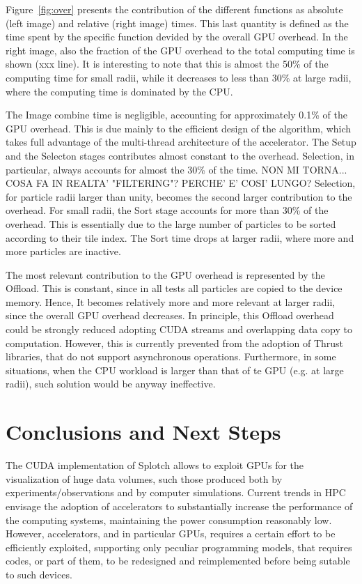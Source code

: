 \documentclass[11pt]{article}
\begin{document}
Figure~\ref{fig:over} presents the contribution of the different functions
as absolute (left image) and relative (right image) times. This last 
quantity is defined as the time spent by the specific function devided by
the overall GPU overhead. In the right image, also the fraction of the GPU
overhead to the total computing time is shown (xxx line). It is interesting to 
note that this is almost the 50\% of the computing time for small radii,
while it decreases to less than 30\% at large radii, where the
computing time is dominated by the CPU. 

The Image combine time is negligible, accounting for approximately 0.1\% of 
the GPU overhead. This is due mainly to the efficient design of the 
algorithm, which takes full advantage of the multi-thread architecture 
of the accelerator. The Setup and the Selecton stages contributes 
almost constant to the overhead. Selection, in particular, 
always accounts for almost the 30\% of the time. NON MI TORNA... COSA FA
IN REALTA' "FILTERING"? PERCHE' E' COSI' LUNGO?
Selection, for particle radii larger than unity, becomes the second 
larger contribution to the overhead. For small radii, the Sort
stage accounts for more than 30\% of the overhead. This is essentially due to 
the large number of particles to be sorted according to their tile index. 
The Sort time drops at larger radii, where more and more particles are
inactive.
 
The most relevant contribution to the GPU overhead is represented by the 
Offload. This is constant, since in all tests all particles are copied 
to the device memory. Hence, It becomes relatively more and more relevant at larger
radii, since the overall GPU overhead decreases. In principle, this Offload overhead could
be strongly reduced adopting CUDA streams and overlapping data copy to 
computation. However, this is currently prevented from the adoption of
Thrust libraries, that do not support asynchronous operations. Furthermore,
in some situations, when the CPU workload is larger than that of
te GPU (e.g. at large radii), such solution would be anyway ineffective.  

\section{Conclusions and Next Steps}
\label{sec:conclusions}

The CUDA implementation of Splotch allows to exploit GPUs 
for the visualization of huge data volumes, such those produced both 
by experiments/observations and by computer simulations. Current trends
in HPC envisage the adoption of accelerators to substantially 
increase the performance of the computing systems, maintaining the power
consumption reasonably low. However, accelerators, and in particular 
GPUs, requires a certain effort to be efficiently exploited, 
supporting only peculiar programming models, that requires codes, or part
of them, to be redesigned and reimplemented before being sutable to such devices. 
\end{document}
